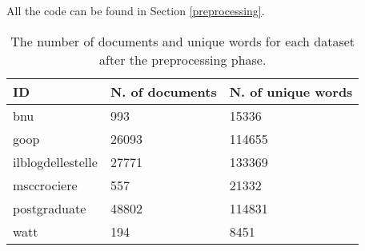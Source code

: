 All the code can be found in Section \ref{preprocessing}.

\begin{table}[H]
    \begin{center}
        \begin{tabular}{ |l|l|l| }
            \hline
            ID                & N. of documents & N. of unique words \\
            \hline
            bnu               & 993             & 15336              \\
            \hline
            goop              & 26093           & 114655             \\
            \hline
            ilblogdellestelle & 27771           & 133369             \\
            \hline
            msccrociere       & 557             & 21332              \\
            \hline
            postgraduate      & 48802           & 114831             \\
            \hline
            watt              & 194             & 8451               \\
            \hline
        \end{tabular}
    \end{center}
    \caption{
        The number of documents and unique words for each dataset after the preprocessing phase.
    }
    \label{table:dbprocdata}
\end{table}